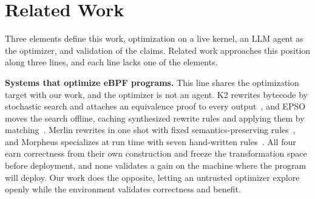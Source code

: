 \section{Related Work}

Three elements define this work, optimization on a live kernel, an LLM agent as the optimizer, and validation of the claims.
Related work approaches this position along three lines, and each line lacks one of the elements.

\noindent\textbf{Systems that optimize eBPF programs.}
This line shares the optimization target with our work, and the optimizer is not an agent.
K2 rewrites bytecode by stochastic search and attaches an equivalence proof to every output~\cite{xu2021synthesizing}, and EPSO moves the search offline, caching synthesized rewrite rules and applying them by matching~\cite{zhu2025epso}.
Merlin rewrites in one shot with fixed semantics-preserving rules~\cite{mao2024merlin}, and Morpheus specializes at run time with seven hand-written rules~\cite{miano2022morpheus}.
All four earn correctness from their own construction and freeze the transformation space before deployment, and none validates a gain on the machine where the program will deploy.
Our work does the opposite, letting an untrusted optimizer explore openly while the environment validates correctness and benefit.

